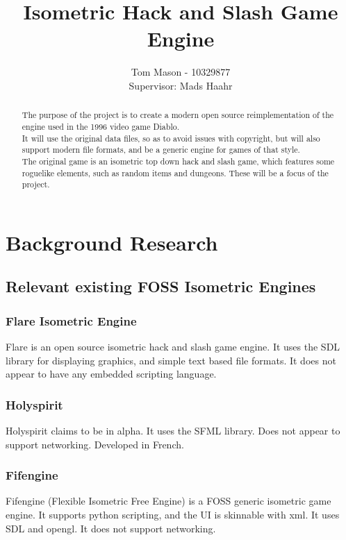 \documentclass[a4paper]{article}
\title{Isometric Hack and Slash Game Engine}
\author{Tom Mason - 10329877\\Supervisor: Mads Haahr}
\begin{document}
\maketitle

\begin{abstract}
The purpose of the project is to create a modern open source reimplementation of the engine used in the 1996 video game Diablo.\\
It will use the original data files, so as to avoid issues with copyright, but will also
support modern file formats, and be a generic engine for games of that style.\\
The original game is an isometric top down hack and slash game, which features some roguelike elements, such as
random items and dungeons. These will be a focus of the project.
\end{abstract}

\newpage

\tableofcontents

\newpage

\section{Background Research}
    \subsection{Relevant existing FOSS Isometric Engines}
    	\subsubsection{Flare Isometric Engine}
    	Flare\cite{flare} is an open source isometric hack and slash game engine. It uses the SDL library for displaying graphics, and simple text based file formats.
    	It does not appear to have any embedded scripting language.
    	
    	\subsubsection{Holyspirit}
    	Holyspirit\cite{holyspirit} claims to be in alpha. It uses the SFML library. Does not appear to support networking.
    	Developed in French.
    	
    	\subsubsection{Fifengine}
    	Fifengine\cite{fife} (Flexible Isometric Free Engine) is a FOSS generic isometric game engine.
    	It supports python scripting, and the UI is skinnable with xml.
    	It uses SDL and opengl. It does not support networking.
    	
\end{document}
